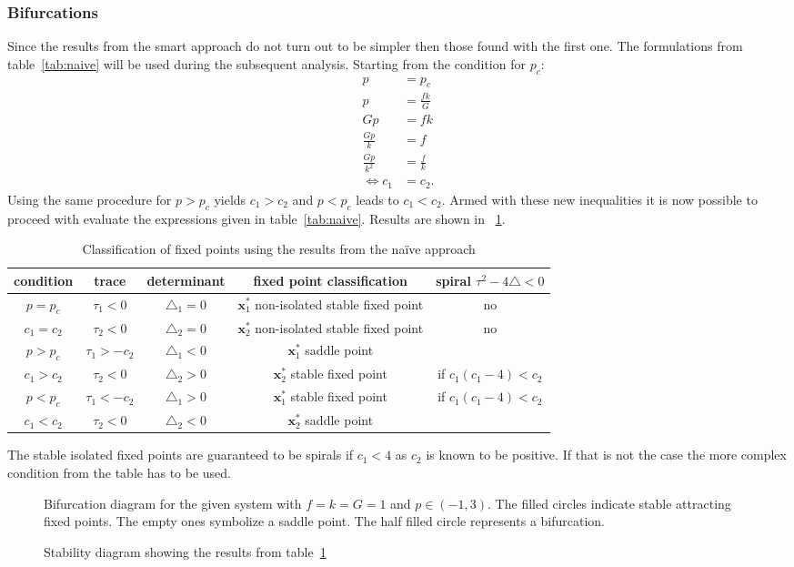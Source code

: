 \subsubsection{Bifurcations}
Since the results from the smart approach do not turn out to be simpler then those found with the first one. The formulations from table~\ref{tab:naive} will be used during the subsequent analysis. Starting from the condition for $p_c$:
\begin{align}
p &= p_c \\
p &= \frac{fk}{G} \\
Gp &= fk \\
\frac{Gp}{k} &= f \\
\frac{Gp}{k^2} &= \frac{f}{k} \\
\Leftrightarrow c_1 &= c_2 .
\end{align}
Using the same procedure for $p > p_c$ yields $c_1 > c_2$ and $p < p_c$ leads to $c_1 < c_2$. Armed with these new inequalities it is now possible to proceed with evaluate the expressions given in table~\ref{tab:naive}. Results are shown in ~\ref{tab:analysis}.
\begin{table}
\centering
\begin{tabular}{|c|c|c|c|c|}
\hline
condition   & trace		   & determinant 		& fixed point classification & spiral $\tau^2 - 4\triangle < 0$ \\
\hline
$p = p_c  $ & $\tau_1 < 0$ & $\triangle_1 = 0 $ & $\mathbf{x}_1^*$ non-isolated stable fixed point & no \\
$c_1 = c_2$ & $\tau_2 < 0$ & $\triangle_2 = 0 $ & $\mathbf{x}_2^*$ non-isolated stable fixed point & no \\
\hline
$p > p_c  $ & $\tau_1 > -c_2$ & $\triangle_1 < 0 $ & $\mathbf{x}_1^*$ saddle point & \\
$c_1 > c_2$ & $\tau_2 < 0$    & $\triangle_2 > 0 $ & $\mathbf{x}_2^*$ stable fixed point & if $c_1(c_1 - 4) < c_2$ \\
\hline
$p < p_c  $ & $\tau_1 < -c_2$ & $\triangle_1 > 0 $ & $\mathbf{x}_1^*$ stable fixed point & if $c_1(c_1 - 4) < c_2$\\
$c_1 < c_2$ & $\tau_2 < 0$    & $\triangle_2 < 0 $ & $\mathbf{x}_2^*$ saddle point & \\
\hline
\end{tabular}
\caption{Classification of fixed points using the results from the na\"{i}ve approach}
\label{tab:analysis}
\end{table}
The stable isolated fixed points are guaranteed to be spirals if $c_1 < 4$ as $c_2$ is known to be positive. If that is not the case the more complex condition from the table has to be used.
\begin{figure}
\centering

\caption{Bifurcation diagram for the given system with $f=k=G=1$ and $p \in (-1,3)$. The filled circles indicate stable attracting fixed points. The empty ones symbolize a saddle point. The half filled circle represents a bifurcation.}

\caption{Stability diagram showing the results from table~\ref{tab:analysis}}
\end{figure}



